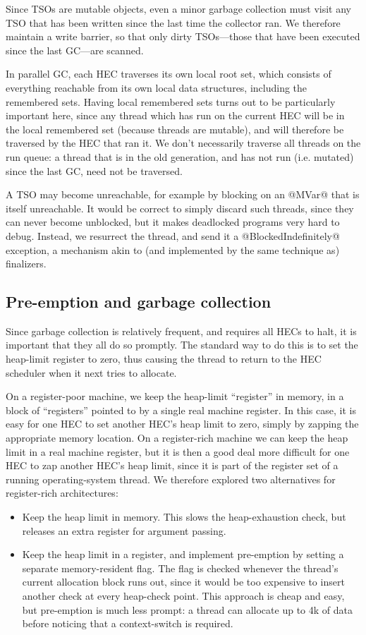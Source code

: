 \documentclass[twocolumn,9pt]{sigplanconf}
\begin{document}
Since TSOs are mutable objects, even a minor garbage collection must
visit any TSO that has been written since the last time the collector
ran.  We therefore maintain a write barrier, so that only dirty TSOs---those
that have been executed since the last GC---are scanned.

In parallel GC, each HEC traverses its own local root set, which
consists of everything reachable from its own local data structures,
including the remembered sets.  Having local remembered sets turns out
to be particularly important here, since any thread which has run on
the current HEC will be in the local remembered set (because threads
are mutable), and will therefore be traversed by the HEC that ran it.
We don't necessarily traverse all threads on the run queue: a thread
that is in the old generation, and has not run (i.e. mutated) since
the last GC, need not be traversed.

A TSO may become unreachable, for example by blocking on an @MVar@
that is itself unreachable.  It would be correct to simply discard
such threads, since they can never become unblocked, but it makes
deadlocked programs very hard to debug.  Instead, we resurrect the
thread, and send it a @BlockedIndefinitely@ exception, a mechanism
akin to (and implemented by the same technique as) finalizers.

\subsection{Pre-emption and garbage collection}
\label{s:context-switch}

Since garbage collection is relatively frequent, and requires all HECs
to halt, it is important that they all do so promptly.  The standard
way to do this is to set the heap-limit register to zero, thus causing
the thread to return to the HEC scheduler when it next tries to
allocate.

On a register-poor machine, we keep the heap-limit ``register'' in
memory, in a block of ``registers'' pointed to by a single real
machine register.  In this case, it is easy for one HEC to set another
HEC's heap limit to zero, simply by zapping the appropriate memory
location.  On a register-rich machine we can keep the heap limit in a
real machine register, but it is then a good deal more difficult for
one HEC to zap another HEC's heap limit, since it is part of the
register set of a running operating-system thread.  We therefore
explored two alternatives for register-rich architectures:
\begin{itemize}
\item Keep the heap limit in memory. This slows the heap-exhaustion
check, but releases an extra register for argument passing.
\item Keep the heap limit in a register, and implement pre-emption by
  setting a separate memory-resident flag.  The flag is checked
  whenever the thread's current allocation block runs out, since it
  would be too expensive to insert another check at every heap-check
  point.  This approach is cheap and easy, but pre-emption is much
  less prompt: a thread can allocate up to 4k of data before noticing
  that a context-switch is required.
\end{itemize}
\end{document}
